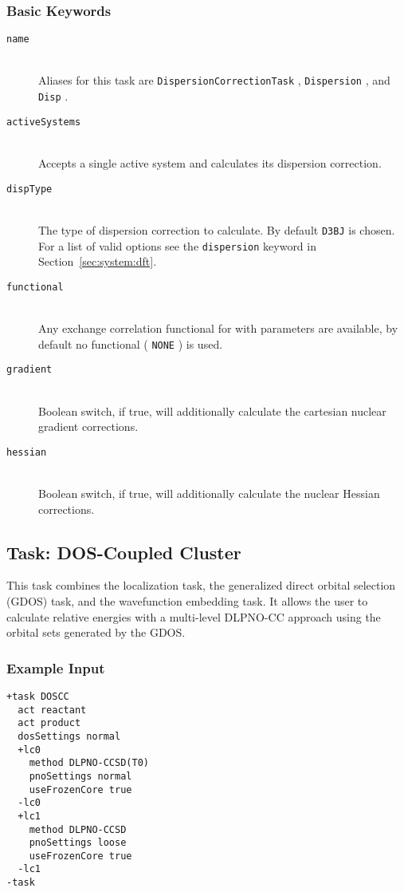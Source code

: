 \documentclass[bibliography=totocnumbered,a4paper,10pt,oneside]{scrbook}
\newcommand{\ttt}[1]{%
  \begingroup\setlength{\fboxsep}{1pt}%
  \colorbox{serenity-green!30}{\texttt{\hspace*{2pt}\vphantom{(g}#1\hspace*{2pt}}}%
  \endgroup
}
\begin{document}
\subsubsection{Basic Keywords}
\begin{description}
  \item [\texttt{name}]\hfill \\
    Aliases for this task are \ttt{DispersionCorrectionTask}, \ttt{Dispersion},  and \ttt{Disp}.
  \item [\texttt{activeSystems}]\hfill \\
    Accepts a single active system and calculates its dispersion correction.
  \item [\texttt{dispType}]\hfill \\
    The type of dispersion correction to calculate. By default \ttt{D3BJ} is chosen.
    For a list of valid options see the \ttt{dispersion} keyword in Section~\ref{sec:system:dft}.
  \item [\texttt{functional}]\hfill \\
    Any exchange correlation functional for with parameters are available, by default no functional (\ttt{NONE}) is used.
  \item [\texttt{gradient}]\hfill \\
    Boolean switch, if true, will additionally calculate the cartesian nuclear gradient corrections.
  \item [\texttt{hessian}]\hfill \\
    Boolean switch, if true, will additionally calculate the nuclear Hessian corrections.
\end{description}

\subsection{Task: DOS-Coupled Cluster}
This task combines the localization task, the generalized direct orbital selection (GDOS)
task, and the wavefunction embedding task. It allows the user to calculate relative energies
with a multi-level DLPNO-CC approach using the orbital sets generated by the GDOS.
\subsubsection{Example Input}
\begin{lstlisting}
+task DOSCC
  act reactant
  act product
  dosSettings normal
  +lc0
    method DLPNO-CCSD(T0)
    pnoSettings normal
    useFrozenCore true
  -lc0
  +lc1
    method DLPNO-CCSD
    pnoSettings loose
    useFrozenCore true
  -lc1
-task
\end{lstlisting}
\end{document}
